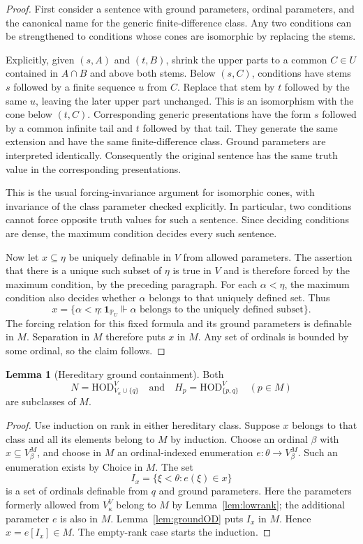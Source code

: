 \documentclass[11pt,letterpaper]{article}
\theoremstyle{definition}
\newtheorem{lemma}[definition]{Lemma}
\numberwithin{equation}{section}
\newcommand{\HOD}{\mathrm{HOD}}
\newcommand{\PP}{\mathbb P}
\begin{document}
\begin{proof}
First consider a sentence with ground parameters, ordinal parameters, and
the canonical name for the generic finite-difference class. Any two
conditions can be strengthened to conditions whose cones are isomorphic
by replacing the stems.

Explicitly, given $(s,A)$ and $(t,B)$, shrink the upper parts to a common
$C\in U$ contained in $A\cap B$ and above both stems. Below $(s,C)$,
conditions have stems $s$ followed by a finite sequence $u$ from $C$.
Replace that stem by $t$ followed by the same $u$, leaving the later upper
part unchanged. This is an isomorphism with the cone below $(t,C)$.
Corresponding generic presentations have the form $s$ followed by a common
infinite tail and $t$ followed by that tail. They generate the same
extension and have the same finite-difference class. Ground parameters
are interpreted identically. Consequently the original sentence has the
same truth value in the corresponding presentations.

This is the usual forcing-invariance argument for isomorphic cones,
with invariance of the class parameter checked explicitly. In particular,
two conditions cannot force opposite truth values for such a sentence.
Since deciding conditions are dense, the maximum condition decides every
such sentence.

Now let $x\subseteq\eta$ be uniquely definable in $V$ from allowed
parameters. The assertion that there is a unique such subset of $\eta$
is true in $V$ and is therefore forced by the maximum condition, by the
preceding paragraph. For each $\alpha<\eta$, the maximum condition also
decides whether $\alpha$ belongs to that uniquely defined set. Thus
\[
 x=\{\alpha<\eta:\mathbf1_{\PP_U}\Vdash
          \alpha\text{ belongs to the uniquely defined subset}\}.
\]
The forcing relation for this fixed formula and its ground parameters is
definable in $M$. Separation in $M$ therefore puts $x$ in $M$.
Any set of ordinals is bounded by some ordinal, so the claim follows.
\end{proof}

\begin{lemma}[Hereditary ground containment]\label{lem:HODground}
Both
\[
 N=\HOD_{V_\kappa\cup\{q\}}^V
 \quad\text{and}\quad H_p=\HOD_{\{p,q\}}^V\quad(p\in M)
\]
are subclasses of $M$.
\end{lemma}

\begin{proof}
Use induction on rank in either hereditary class. Suppose $x$ belongs to
that class and all its elements belong to $M$ by induction. Choose an
ordinal $\beta$ with $x\subseteq V_\beta^M$, and choose in $M$ an
ordinal-indexed enumeration $e:\theta\to V_\beta^M$. Such an enumeration
exists by Choice in $M$. The set
\[
 I_x=\{\xi<\theta:e(\xi)\in x\}
\]
is a set of ordinals definable from $q$ and ground parameters. Here the
parameters formerly allowed from $V_\kappa^V$ belong to $M$ by
Lemma~\ref{lem:lowrank}; the additional parameter $e$ is also in $M$.
Lemma~\ref{lem:groundOD} puts $I_x$ in $M$. Hence $x=e[I_x]\in M$.
The empty-rank case starts the induction.
\end{proof}
\end{document}
